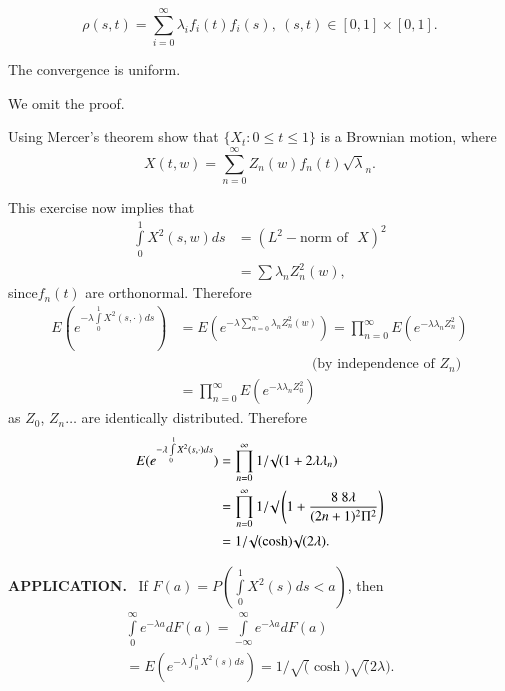 \begin{theorem*}[(Mercer)]
$$
\rho(s,t)=\sum\limits^{\infty}_{i=0}\lambda_{i}f_{i}(t)f_{i}(s),\ (s,t)\in
    [0,1]\times [0,1].
$$

The convergence is uniform.
\end{theorem*}

We omit the proof.

\begin{exercise}\label{chap14-exer3}
Using Mercer's theorem show that $\{X_t:0\leq t\leq 1\}$ is a
  Brownian motion, where
$$
X(t,w)=\sum\limits^{\infty}_{n=0}Z_{n}(w)f_{n}(t)\surd\lambda_{n}.
$$
\end{exercise}

This exercise now implies that
\begin{align*}
\int\limits^{1}_{0}X^{2}(s,w)ds &= (L^{2}-\text{norm of~ }X)^{2}\\
&= \sum\lambda_{n}Z^{2}_{n}(w),
\end{align*}
since\pageoriginale $f_{n}(t)$ are orthonormal. Therefore
\begin{align*}
E(e^{-\lambda\int\limits^{1}_{0}X^{2}(s,\cdot)ds}) &=
E(e^{-\lambda\sum\limits^{\infty}_{n=0}\lambda_{n}Z^{2}_{n}(w)})=\prod\limits^{\infty}_{n=0}E(e^{-\lambda\lambda_{n}Z^{2}_{n}})\\
&\hspace{4cm}\text{(by independence of $Z_{n}$)}\\
&= \prod\limits^{\infty}_{n=0}E(e^{-\lambda\lambda_{n}Z^{2}_{0}})
\end{align*}
as $Z_{0}$, $Z_{n}\ldots$ are identically distributed. Therefore
\begin{align*}
E(e^{-\lambda\int\limits^{1}_{0}X^{2}(s,\cdot)ds}) &=
\prod^{\infty}_{n=0}1/\surd (1+2\lambda\lambda_{n})\\
&=
\prod^{\infty}_{n=0}1/\surd\left(1+\frac{8\ 8\lambda}{(2n+1)^{2}\Pi^{2}}\right)\\
&= 1/\surd (\cosh)\surd(2\lambda). 
\end{align*}

\noindent
{\bf APPLICATION.}~ If $F(a)=P(\int\limits^{1}_{0}X^{2}(s)ds<a)$, then
\begin{gather*}
\int\limits^{\infty}_{0}e^{-\lambda
  a}dF(a)=\int\limits^{\infty}_{-\infty}e^{-\lambda a}dF(a)\\
=E(e^{-\lambda\int^{1}_{0}X^{2}(s)ds})=1/\surd(\cosh)\surd(2\lambda).
\end{gather*}


